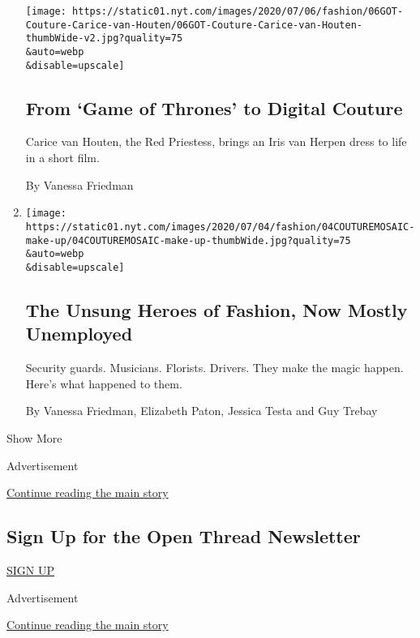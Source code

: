 \begin{enumerate}
  \texttt{[image: https://static01.nyt.com/images/2020/07/06/fashion/06GOT-Couture-Carice-van-Houten/06GOT-Couture-Carice-van-Houten-thumbWide-v2.jpg?quality=75\\\&auto=webp\\\&disable=upscale]}

  \hypertarget{from-game-of-thrones-to-digital-couture}{%
  \subsection{From `Game of Thrones' to Digital
  Couture}\label{from-game-of-thrones-to-digital-couture}}

  Carice van Houten, the Red Priestess, brings an Iris van Herpen dress
  to life in a short film.

  By Vanessa Friedman
\item
  \href{/2020/07/04/style/couture-workers-fashion-coronavirus.html}{}

  \texttt{[image: https://static01.nyt.com/images/2020/07/04/fashion/04COUTUREMOSAIC-make-up/04COUTUREMOSAIC-make-up-thumbWide.jpg?quality=75\\\&auto=webp\\\&disable=upscale]}

  \hypertarget{the-unsung-heroes-of-fashion-now-mostly-unemployed}{%
  \subsection{The Unsung Heroes of Fashion, Now Mostly
  Unemployed}\label{the-unsung-heroes-of-fashion-now-mostly-unemployed}}

  Security guards. Musicians. Florists. Drivers. They make the magic
  happen. Here's what happened to them.

  By Vanessa Friedman, Elizabeth Paton, Jessica Testa and Guy Trebay
\end{enumerate}

Show More

Advertisement

\protect\hyperlink{after-mid2}{Continue reading the main story}

\hypertarget{sign-up-for-the-open-thread-newsletter}{%
\subsection{Sign Up for the Open Thread
Newsletter}\label{sign-up-for-the-open-thread-newsletter}}

\href{/newsletters/signup/TZ}{SIGN UP}

Advertisement

\protect\hyperlink{after-mktg}{Continue reading the main story}

